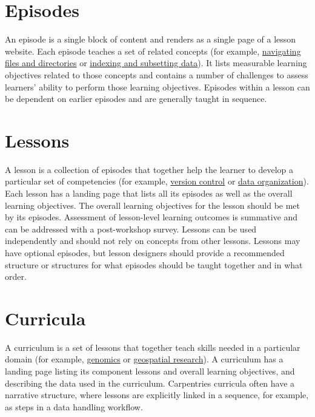 \documentclass[
]{book}
\begin{document}
\hypertarget{episodes}{%
\section{Episodes}\label{episodes}}

An episode is a single block of content and renders as a single page of a lesson website.
Each episode teaches a set of related concepts (for example,
\href{http://swcarpentry.github.io/shell-novice/02-filedir/index.html}{navigating files and directories}
or \href{https://datacarpentry.org/python-ecology-lesson/03-index-slice-subset/index.html}{indexing and subsetting data}).
It lists measurable learning objectives related to those concepts
and contains a number of challenges to assess
learners' ability to perform those learning objectives. Episodes within a lesson can be
dependent on earlier episodes and are generally taught in sequence.

\hypertarget{lessons}{%
\section{Lessons}\label{lessons}}

A lesson is a collection of episodes that together help the learner to develop a particular
set of competencies
(for example, \href{http://swcarpentry.github.io/git-novice/}{version control} or
\href{http://www.datacarpentry.org/spreadsheets-socialsci/}{data organization}).
Each lesson has a landing page that lists all its episodes as well
as the overall learning objectives. The overall learning objectives for the lesson
should be met by its episodes. Assessment of lesson-level learning outcomes is summative and
can be addressed with a post-workshop survey. Lessons can be used independently and should
not rely on concepts from other lessons. Lessons may have optional episodes, but lesson
designers should provide a recommended structure or structures for what episodes should
be taught together and in what order.

\hypertarget{curricula}{%
\section{Curricula}\label{curricula}}

A curriculum is a set of lessons that together teach skills needed in a particular
domain (for example, \href{https://datacarpentry.org/genomics-workshop/}{genomics} or
\href{https://datacarpentry.org/geospatial-workshop/}{geospatial research}). A curriculum has a
landing page listing its component lessons and overall learning objectives, and describing
the data used in the curriculum. Carpentries curricula often have a narrative structure,
where lessons are explicitly linked in a sequence, for example, as steps in a data handling
workflow.
\end{document}
